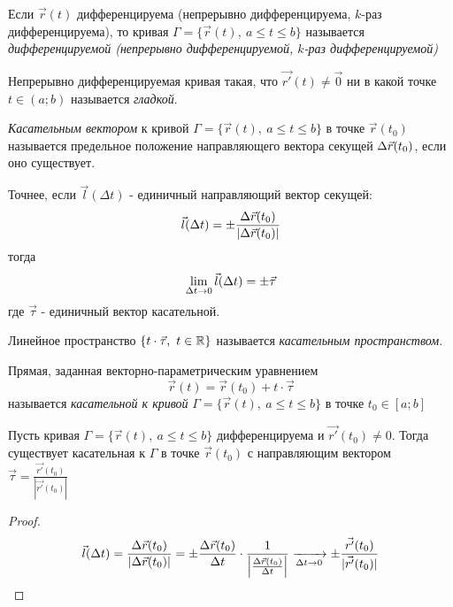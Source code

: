 \begin{definition}
	Если $\vec{r}(t)$ дифференцируема (непрерывно дифференцируема, $k$-раз дифференцируема), то кривая $\Gamma = \{\vec{r}(t),\ a \le t \le b\}$ называется \textit{дифференцируемой (непрерывно дифференцируемой, $k$-раз дифференцируемой)}
\end{definition}

\begin{definition}
	Непрерывно дифференцируемая кривая такая, что $\vec{r'}(t) \neq \vec{0}$ ни в какой точке $t \in (a; b)$ называется \textit{гладкой}.
\end{definition}

\begin{definition}
	\textit{Касательным вектором} к кривой $\Gamma = \{\vec{r}(t),\ a \le t \le b\}$ в точке $\vec{r}(t_0)$ называется предельное положение направляющего вектора секущей $\Delta\vec{r}(t_0)$, если оно существует.
	
	Точнее, если $\vec{l}(\Delta t)$ - единичный направляющий вектор секущей:
	\[
		\vec{l}(\Delta t) = \pm \frac{\Delta\vec{r}(t_0)}{|\Delta\vec{r}(t_0)|}
	\]
	тогда
	\[
		\lim\limits_{\Delta t \to 0} \vec{l}(\Delta t) = \pm \vec{\tau}
	\]
	где $\vec{\tau}$ - единичный вектор касательной.
\end{definition}

\begin{definition}
	Линейное пространство $\{t \cdot \vec{\tau},\ t \in \mathbb{R}\}$ называется \textit{касательным пространством}.
\end{definition}

\begin{definition}
	Прямая, заданная векторно-параметрическим уравнением
	\[
		\vec{r}(t) = \vec{r}(t_0) + t\cdot \vec{\tau}
	\]
	называется \textit{касательной к кривой} $\Gamma = \{\vec{r}(t),\ a \le t \le b\}$ в точке $t_0 \in [a; b]$
\end{definition}


\begin{lemma}
	Пусть кривая $\Gamma = \{\vec{r}(t),\ a \le t \le b\}$ дифференцируема и $\vec{r'}(t_0) \neq 0$. Тогда существует касательная к $\Gamma$ в точке $\vec{r}(t_0)$ с направляющим вектором $\vec{\tau} = \frac{\vec{r'}(t_0)}{|\vec{r'}(t_0)|}$
\end{lemma}

\begin{proof}
	\[
		\vec{l}(\Delta t) = \frac{\Delta\vec{r}(t_0)}{|\Delta\vec{r}(t_0)|} = \pm \frac{\Delta\vec{r}(t_0)}{\Delta t} \cdot \frac{1}{\left|\frac{\Delta\vec{r}(t_0)}{\Delta t}\right|} \xrightarrow[\Delta t \to 0]{} \pm \frac{\vec{r'}(t_0)}{|\vec{r'}(t_0)|}
	\]
\end{proof}


